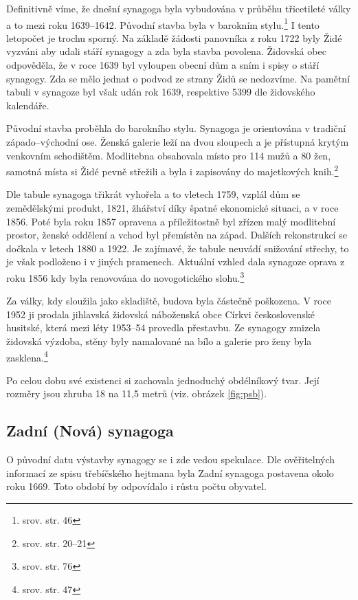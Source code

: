 \documentclass[a4paper,oneside,12pt]{report}
\begin{document}
Definitivně víme, že dnešní synagoga byla vybudována v průběhu třicetileté války a to mezi roku 1639--1642.
Původní stavba byla v barokním stylu.\footnote{srov. \cite{Klenovsky2003} str. 46}
I tento letopočet je trochu sporný.
Na základě žádosti panovníka z roku 1722 byly Židé vyzváni aby udali stáří synagogy a zda byla stavba povolena.
Židovská obec odpověděla, že v roce 1639 byl vyloupen obecní dům a sním i spisy o stáří synagogy.
Zda se mělo jednat o podvod ze strany Židů se nedozvíme.
Na pamětní tabuli v synagoze byl však udán rok 1639, respektive 5399 dle židovského kalendáře.

Původní stavba proběhla do barokního stylu.
Synagoga je orientována v tradiční západo--východní ose.
Ženská galerie leží na dvou sloupech a je přístupná krytým venkovním schodištěm.
Modlitebna obsahovala místo pro 114 mužů a 80 žen, samotná místa si Židé pevně střežili a byla i zapisovány do majetkových knih.\footnote{srov. \cite{Hanackova2008} str. 20--21}

Dle tabule synagoga třikrát vyhořela a to vletech 1759, vzplál dům se zemědělskými produkt, 1821, žhářství díky špatné ekonomické situaci, a v roce 1856.
Poté byla roku 1857 opravena a příležitostně byl zřízen malý modlitební prostor, ženské oddělení a vchod byl přemístěn na západ.
Dalších rekonstrukcí se dočkala v letech 1880 a 1922.
Je zajímavé, že tabule neuvádí snižování střechy, to je však podloženo i v jiných pramenech.
Aktuální vzhled dala synagoze oprava z roku 1856 kdy byla renovována do novogotického slohu.\footnote{srov. \cite{Fiser2005} str. 76}

Za války, kdy sloužila jako skladiště, budova byla částečně poškozena.
V roce 1952 ji prodala jihlavská židovská náboženská obce Církvi československé husitské, která mezi léty 1953--54 provedla přestavbu.
Ze synagogy zmizela židovská výzdoba, stěny byly namalované na bílo a galerie pro ženy byla zasklena.\footnote{srov. \cite{Klenovsky2003} str. 47}

Po celou dobu své existenci si zachovala jednoduchý obdélníkový tvar.
Její rozměry jsou zhruba 18 na 11,5 metrů (viz. obrázek \ref{fig:psb}).

\subsection{Zadní (Nová) synagoga}

O původní datu výstavby synagogy se i zde vedou spekulace.
Dle ověřitelných informací ze spisu třebíčského hejtmana byla Zadní synagoga postavena okolo roku 1669.
Toto období by odpovídalo i růstu počtu obyvatel.
\end{document}
